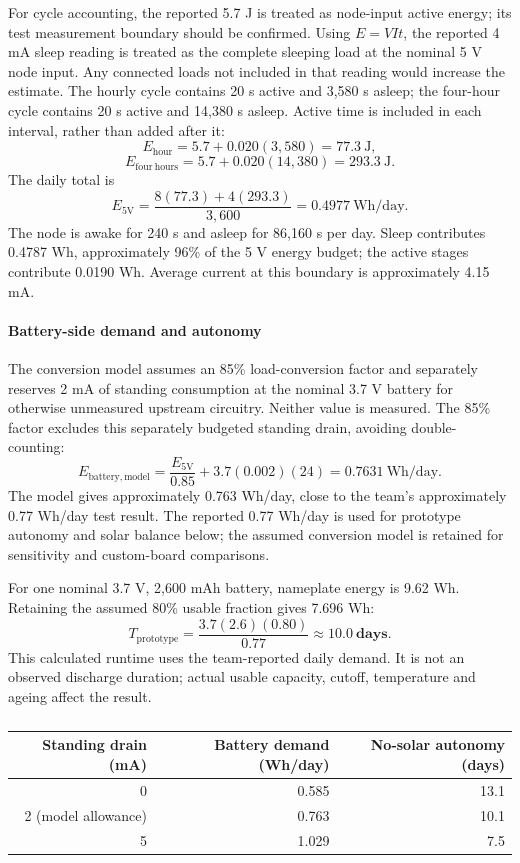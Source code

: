 For cycle accounting, the reported 5.7 J is treated as node-input active energy; its test measurement boundary should be confirmed. Using $E=VIt$, the reported 4 mA sleep reading is treated as the complete sleeping load at the nominal 5 V node input. Any connected loads not included in that reading would increase the estimate. The hourly cycle contains 20 s active and 3,580 s asleep; the four-hour cycle contains 20 s active and 14,380 s asleep. Active time is included in each interval, rather than added after it:
\[
E_{\mathrm{hour}}=5.7+0.020(3{,}580)=77.3\ \mathrm{J},
\]
\[
E_{\mathrm{four\ hours}}=5.7+0.020(14{,}380)=293.3\ \mathrm{J}.
\]
The daily total is
\[
E_{5\mathrm{V}}=\frac{8(77.3)+4(293.3)}{3{,}600}
=0.4977\ \mathrm{Wh/day}.
\]
The node is awake for 240 s and asleep for 86,160 s per day. Sleep contributes 0.4787 Wh, approximately 96\% of the 5 V energy budget; the active stages contribute 0.0190 Wh. Average current at this boundary is approximately 4.15 mA.

\paragraph{Battery-side demand and autonomy}
The conversion model assumes an 85\% load-conversion factor and separately reserves 2 mA of standing consumption at the nominal 3.7 V battery for otherwise unmeasured upstream circuitry. Neither value is measured. The 85\% factor excludes this separately budgeted standing drain, avoiding double-counting:
\[
E_{\mathrm{battery,model}}=\frac{E_{5\mathrm{V}}}{0.85}
 +3.7(0.002)(24)=0.7631\ \mathrm{Wh/day}.
\]
The model gives approximately 0.763 Wh/day, close to the team's approximately 0.77 Wh/day test result. The reported 0.77 Wh/day is used for prototype autonomy and solar balance below; the assumed conversion model is retained for sensitivity and custom-board comparisons.

For one nominal 3.7 V, 2,600 mAh battery, nameplate energy is 9.62 Wh. Retaining the assumed 80\% usable fraction gives 7.696 Wh:
\[
T_{\mathrm{prototype}}=\frac{3.7(2.6)(0.80)}{0.77}
\approx\mathbf{10.0\ days}.
\]
This calculated runtime uses the team-reported daily demand. It is not an observed discharge duration; actual usable capacity, cutoff, temperature and ageing affect the result.

\begin{table}[htbp]
\centering\small\color{black}
\caption{}
\label{tab:power_overhead_sensitivity}
\begin{tabular}{rrr}
\toprule
Standing drain (mA) & Battery demand (Wh/day) & No-solar autonomy (days) \\
\midrule
0 & 0.585 & 13.1 \\
2 (model allowance) & 0.763 & 10.1 \\
5 & 1.029 & 7.5 \\
\bottomrule
\end{tabular}
\end{table}
\FloatBarrier

